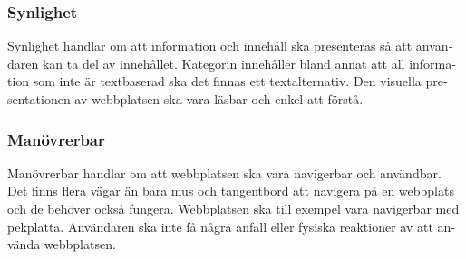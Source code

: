 \documentclass[11p]{article}
\begin{document}
\begin{otherlanguage}{swedish}
    \subsubsection{Synlighet} %
    Synlighet handlar om att information och innehåll ska presenteras så att användaren kan ta del av innehållet.
    Kategorin innehåller bland annat att all information som inte är textbaserad ska det finnas ett textalternativ.
    Den visuella presentationen av webbplatsen ska vara läsbar och enkel att förstå.

    
    \subsubsection{Manövrerbar}
    Manövrerbar handlar om att webbplatsen ska vara navigerbar och användbar.
    Det finns flera vägar än bara mus och tangentbord att navigera på en webbplats och de behöver också fungera.
    Webbplatsen ska till exempel vara navigerbar med pekplatta.
    Användaren ska inte få några anfall eller fysiska reaktioner av att använda webbplatsen. %


\end{otherlanguage}
\end{document}
